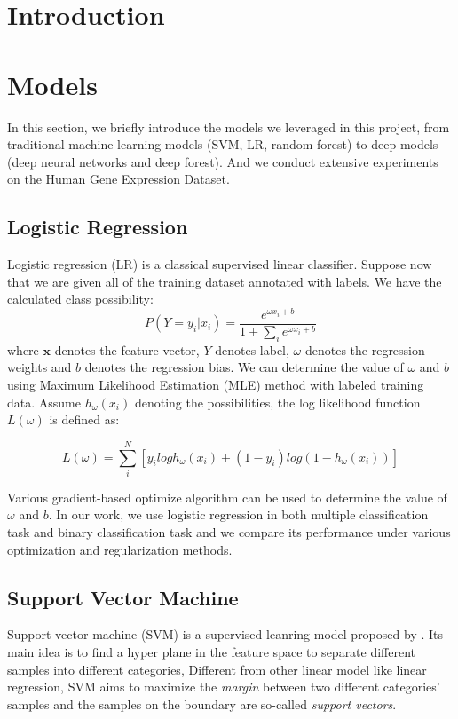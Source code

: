\documentclass[sigconf]{acmart}
\begin{document}
	
	\section{Introduction}
	
	
	\section{Models}
	In this section, we briefly introduce the models we leveraged in this project, from traditional machine learning models (SVM, LR, random forest) to deep models (deep neural networks and deep forest). And we conduct extensive experiments on the Human Gene Expression Dataset.
	
	
	\subsection{Logistic Regression}
	Logistic regression (LR) \cite{hosmer2013applied} is a  classical  supervised linear classifier.
	Suppose now that we are given all of the training dataset annotated with labels. We have the calculated class possibility:
	\begin{equation}
	P(Y=y_i|x_i)=\frac{e^{\omega x_i +b}}{1+\sum_i e^{\omega x_i +b}} 
	\label{lr_1}
	\end{equation}
	where $\mathbf{x}$ denotes the feature vector, $Y$ denotes label, $\omega$ denotes the regression weights and $b$ denotes the regression bias. We can determine the value of $\omega$ and $b$ using Maximum Likelihood Estimation (MLE) method with labeled training data. Assume $h_\omega(x_i)$ denoting the possibilities, the log likelihood function $L(\omega)$ is defined as:
	
	\begin{centering}
		\begin{equation}
		L(\omega)=\sum^N_i[y_i logh_\omega(x_i)+(1-y_i) log(1-h_\omega(x_i))]
		\label{lr_2}
		\end{equation}
		
	\end{centering}
	
	Various gradient-based optimize algorithm can be used to determine the value of $\omega$ and $b$. In our work, we use logistic regression in both multiple classification task and binary classification task and we compare its performance under various optimization and regularization methods.
	
	
		
	
	\subsection{Support Vector Machine}
	Support vector machine (SVM) is a supervised leanring model proposed by \citet{cortes1995support}. Its main idea is to find a hyper plane in the feature space to separate different samples into different categories, Different from other linear model like linear regression, SVM aims to maximize the \textit{margin} between two different categories' samples and the samples on the boundary are so-called \textit{support vectors}. 
	
\end{document}
